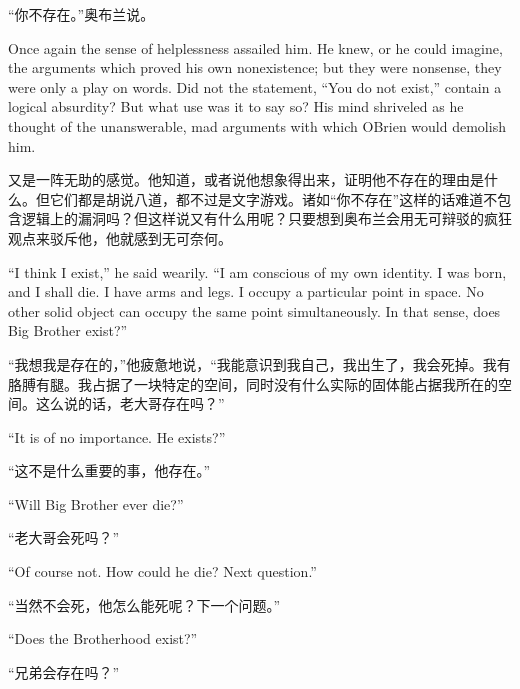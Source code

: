 \begin{paracol}{2}
``你不存在。''奥布兰说。

\switchcolumn*

Once again the sense of helplessness assailed him. He knew, or he could
imagine, the arguments which proved his own nonexistence; but they were
nonsense, they were only a play on words. Did not the statement, ``You do
not exist,'' contain a logical absurdity? But what use was it to say so?
His mind shriveled as he thought of the unanswerable, mad arguments with
which O\textquotesingle Brien would demolish him.

\switchcolumn

又是一阵无助的感觉。他知道，或者说他想象得出来，证明他不存在的理由是什么。但它们都是胡说八道，都不过是文字游戏。诸如``你不存在''这样的话难道不包含逻辑上的漏洞吗？但这样说又有什么用呢？只要想到奥布兰会用无可辩驳的疯狂观点来驳斥他，他就感到无可奈何。

\switchcolumn*

``I think I exist,'' he said wearily. ``I am conscious of my own identity.
I was born, and I shall die. I have arms and legs. I occupy a particular
point in space. No other solid object can occupy the same point
simultaneously. In that sense, does Big Brother exist?''

\switchcolumn

``我想我是存在的，''他疲惫地说，``我能意识到我自己，我出生了，我会死掉。我有胳膊有腿。我占据了一块特定的空间，同时没有什么实际的固体能占据我所在的空间。这么说的话，老大哥存在吗？''

\switchcolumn*

``It is of no importance. He exists?''

\switchcolumn

``这不是什么重要的事，他存在。''

\switchcolumn*

``Will Big Brother ever die?''

\switchcolumn

``老大哥会死吗？''

\switchcolumn*

``Of course not. How could he die? Next question.''

\switchcolumn

``当然不会死，他怎么能死呢？下一个问题。''

\switchcolumn*

``Does the Brotherhood exist?''

\switchcolumn

``兄弟会存在吗？''


\end{paracol}
